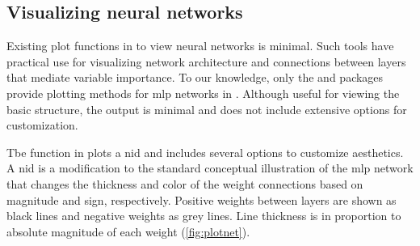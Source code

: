 \documentclass[article,shortnames]{jss}\usepackage[]{graphicx}\usepackage[]{color}
\begin{document}
\subsection{Visualizing neural networks}

Existing plot functions in  to view neural networks is minimal.  Such tools have practical use for visualizing network architecture and connections between layers that mediate variable importance. To our knowledge, only the  and  packages provide plotting methods for \ac{mlp} networks in .  Although useful for viewing the basic structure, the output is minimal and does not include extensive options for customization.

Tbe  function in  plots a \acl{nid} \citep[\acs{nid},][]{Ozesmi99} and includes several options to customize aesthetics. A \ac{nid} is a modification to the standard conceptual illustration of the \ac{mlp} network that changes the thickness and color of the weight connections based on magnitude and sign, respectively.  Positive weights between layers are shown as black lines and negative weights as grey lines. Line thickness is in proportion to absolute magnitude of each weight (\cref{fig:plotnet}).
\end{document}
